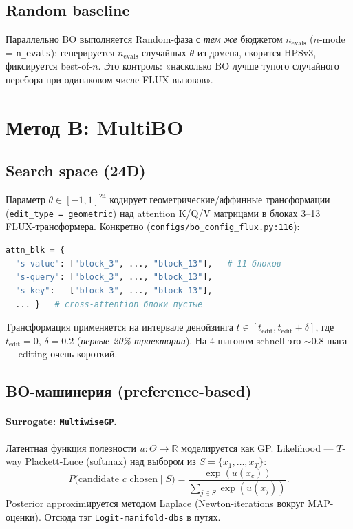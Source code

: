 \documentclass[11pt,a4paper]{article}
\begin{document}
\subsection{Random baseline}

Параллельно BO выполняется Random-фаза с \emph{тем же} бюджетом
$n_\text{evals}$ ($n$-mode = \texttt{n\_evals}): генерируется $n_\text{evals}$
случайных $\theta$ из домена, скорится HPSv3, фиксируется best-of-$n$.
Это контроль: «насколько BO лучше тупого случайного перебора при
одинаковом числе FLUX-вызовов».

\section{Метод B: MultiBO}

\subsection{Search space (24D)}

Параметр $\theta \in [-1, 1]^{24}$ кодирует геометрические/аффинные
трансформации (\texttt{edit\_type = geometric}) над attention K/Q/V
матрицами в блоках 3--13 FLUX-трансформера. Конкретно
(\texttt{configs/bo\_config\_flux.py:116}):
\begin{lstlisting}[language=Python]
attn_blk = {
  "s-value": ["block_3", ..., "block_13"],   # 11 блоков
  "s-query": ["block_3", ..., "block_13"],
  "s-key":   ["block_3", ..., "block_13"],
  ... }   # cross-attention блоки пустые
\end{lstlisting}
Трансформация применяется на интервале денойзинга $t \in [t_\text{edit},
t_\text{edit} + \delta]$, где $t_\text{edit}=0$, $\delta=0.2$
(\emph{первые 20\% траектории}). На 4-шаговом schnell это
$\sim\!0.8$ шага --- editing очень короткий.

\subsection{BO-машинерия (preference-based)}

\paragraph{Surrogate: \texttt{MultiwiseGP}.}
Латентная функция полезности $u: \Theta \to \mathbb{R}$ моделируется как
GP. Likelihood --- $T$-way Plackett-Luce (softmax) над выбором из
$S = \{x_1,\ldots,x_T\}$:
\[
  P\bigl(\text{candidate }c \text{ chosen} \mid S\bigr)
  = \frac{\exp(u(x_c))}{\sum_{j \in S} \exp(u(x_j))}.
\]
Posterior approximируется методом Laplace (Newton-iterations вокруг
MAP-оценки). Отсюда тэг \texttt{Logit-manifold-dbs} в путях.
\end{document}
